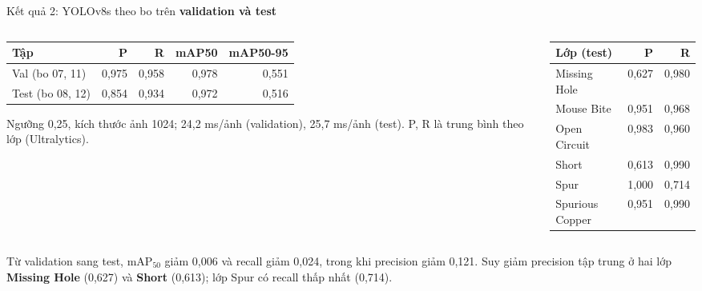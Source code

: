 \documentclass[aspectratio=169,11pt,t]{beamer}
\newcommand{\hl}[1]{{\bfseries\color{coral}#1}}
\newcommand{\hdr}[1]{{\bfseries\color{muted}#1}}
\newcommand{\mynote}[1]{{\color{muted}\footnotesize #1}}
\begin{document}
\begin{frame}{Kết quả 2: YOLOv8s theo bo trên \hl{validation và test}}
  \begin{columns}[T]
    \begin{column}{0.52\textwidth}
      \footnotesize
      \renewcommand{\arraystretch}{1.35}\setlength{\tabcolsep}{2pt}
      \begin{tabular}{@{}lrrrr@{}}
        \toprule
        \hdr{Tập} & \hdr{P} & \hdr{R} & \hdr{mAP50} & \hdr{mAP50-95} \\
        \midrule
        Val (bo 07, 11) & 0,975 & 0,958 & 0,978 & 0,551 \\
        Test (bo 08, 12) & \cellcolor{danger!15}0,854 & 0,934 & 0,972 & 0,516 \\
        \bottomrule
      \end{tabular}
      \vspace{4pt}\par
      \mynote{Ngưỡng 0,25, kích thước ảnh 1024; 24,2 ms/ảnh (validation), 25,7 ms/ảnh (test). P, R là trung bình theo lớp (Ultralytics).}
    \end{column}
    \begin{column}{0.44\textwidth}
      \footnotesize
      \renewcommand{\arraystretch}{1.25}\setlength{\tabcolsep}{4pt}
      \begin{tabular}{@{}lrr@{}}
        \toprule
        \hdr{Lớp (test)} & \hdr{P} & \hdr{R} \\
        \midrule
        Missing Hole & \cellcolor{danger!15}0,627 & 0,980 \\
        Mouse Bite & 0,951 & 0,968 \\
        Open Circuit & 0,983 & 0,960 \\
        Short & \cellcolor{danger!15}0,613 & 0,990 \\
        Spur & 1,000 & \cellcolor{amber!25}0,714 \\
        Spurious Copper & 0,951 & 0,990 \\
        \bottomrule
      \end{tabular}
    \end{column}
  \end{columns}
  \vspace{4pt}
  \begin{key}
    \small Từ validation sang test, $\mathrm{mAP}_{50}$ giảm 0,006 và recall giảm 0,024, trong khi precision giảm 0,121. Suy giảm precision tập trung ở hai lớp \textbf{Missing Hole} (0,627) và \textbf{Short} (0,613); lớp Spur có recall thấp nhất (0,714).
  \end{key}
\end{frame}
\end{document}

